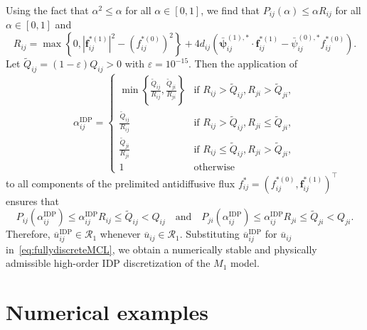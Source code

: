 \documentclass[preprint, 11pt]{elsarticle}
\newcommand{\f}{\mathbf{f}}
\begin{document}
Using the
fact that $\alpha^2 \leq \alpha$ for all $\alpha\in[0,1]$, we find that
$P_{ij} (\alpha)\leq \alpha R_{ij}$ for all $\alpha\in[0,1]$ and
\begin{equation*}
    R_{ij} = \max\left\{  0, \left|\f_{ij}^{*(1)}\right|^2 - \left(f_{ij}^{*(0)}\right)^2  \right\} + 4 d_{ij} \left(\bar{\bm\psi}^{(1),*}_{ij}\cdot \f_{ij}^{*(1)} -  \bar\psi^{(0),*}_{ij}f_{ij}^{*(0)}\right).
\end{equation*}
Let $\tilde{Q}_{ij} = (1-\varepsilon) Q_{ij}>0$ with $\varepsilon = 10^{-15}$.
Then the application of
\begin{equation*}
    \alpha_{ij}^{\mathrm{IDP}} = \begin{cases}
        \min\left\{ \frac{\tilde Q_{ij}}{R_{ij}} , \frac{\tilde Q_{ji}}{R_{ji}} \right\} &\text{if } R_{ij} > \tilde Q_{ij}, R_{ji} >\tilde Q_{ji},\\
        \frac{\tilde Q_{ij}}{R_{ij}} &\text{if }R_{ij} > \tilde Q_{ij}, R_{ji} \leq  \tilde Q_{ji},\\
        \frac{\tilde Q_{ji}}{R_{ji}} &\text{if }R_{ij} \leq  \tilde Q_{ij}, R_{ji} >  \tilde Q_{ji},\\
        1 &\text{otherwise}
    \end{cases}
\end{equation*}
to all components of the prelimited antidiffusive flux $f_{ij}^* = (f_{ij}^{*(0)}, \f_{ij}^{*(1)})^\top$ ensures that
\begin{equation*}
    P_{ij}(\alpha_{ij}^{\mathrm{IDP}}) \leq \alpha_{ij}^{\mathrm{IDP}} R_{ij} \leq \tilde Q_{ij} < Q_{ij} \quad \text{and} \quad P_{ji}(\alpha_{ij}^{\mathrm{IDP}}) \leq \alpha_{ij}^{\mathrm{IDP}} R_{ji} \leq \tilde Q_{ji}< Q_{ji}. 
\end{equation*}
Therefore, $\overline{u}_{ij}^{\mathrm{IDP}}\in\mathcal{R}_1$ whenever $\overline{u}_{ij}\in\mathcal{R}_1$.
Substituting $\overline{u}_{ij}^{\mathrm{IDP}}$ for  $\overline{u}_{ij}$
in~\eqref{eq:fullydiscreteMCL}, we obtain a numerically stable and physically
admissible high-order IDP discretization of the $M_1$ model.


\section{Numerical examples}
\label{sec:examples}
\end{document}
